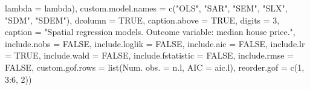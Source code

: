 \documentclass[
  letterpaper,
  DIV=11,
  numbers=noendperiod]{scrreprt}
\newenvironment{Shaded}{\begin{snugshade}}{\end{snugshade}}
\newcommand{\AttributeTok}[1]{\textcolor[rgb]{0.40,0.45,0.13}{#1}}
\newcommand{\ConstantTok}[1]{\textcolor[rgb]{0.56,0.35,0.01}{#1}}
\newcommand{\DecValTok}[1]{\textcolor[rgb]{0.68,0.00,0.00}{#1}}
\newcommand{\FunctionTok}[1]{\textcolor[rgb]{0.28,0.35,0.67}{#1}}
\newcommand{\NormalTok}[1]{\textcolor[rgb]{0.00,0.23,0.31}{#1}}
\newcommand{\OtherTok}[1]{\textcolor[rgb]{0.00,0.23,0.31}{#1}}
\newcommand{\SpecialCharTok}[1]{\textcolor[rgb]{0.37,0.37,0.37}{#1}}
\newcommand{\StringTok}[1]{\textcolor[rgb]{0.13,0.47,0.30}{#1}}
\begin{document}
\begin{Shaded}
\begin{Highlighting}[]
                                 \StringTok{\textquotesingle{}lambda\textquotesingle{}} \OtherTok{=} \StringTok{\textquotesingle{}lambda\textquotesingle{}}\NormalTok{),}
          \AttributeTok{custom.model.names =} \FunctionTok{c}\NormalTok{(}\StringTok{"OLS"}\NormalTok{, }\StringTok{"SAR"}\NormalTok{, }\StringTok{"SEM"}\NormalTok{, }\StringTok{"SLX"}\NormalTok{, }\StringTok{"SDM"}\NormalTok{, }\StringTok{"SDEM"}\NormalTok{),}
          \AttributeTok{dcolumn =} \ConstantTok{TRUE}\NormalTok{, }\AttributeTok{caption.above =} \ConstantTok{TRUE}\NormalTok{, }\AttributeTok{digits =} \DecValTok{3}\NormalTok{,}
          \AttributeTok{caption =} \StringTok{"Spatial regression models. Outcome variable: median house price."}\NormalTok{,}
          \AttributeTok{include.nobs =} \ConstantTok{FALSE}\NormalTok{,}
  \AttributeTok{include.loglik =} \ConstantTok{FALSE}\NormalTok{,}
  \AttributeTok{include.aic =} \ConstantTok{FALSE}\NormalTok{,}
  \AttributeTok{include.lr =} \ConstantTok{TRUE}\NormalTok{,}
  \AttributeTok{include.wald =} \ConstantTok{FALSE}\NormalTok{,}
  \AttributeTok{include.fstatistic =} \ConstantTok{FALSE}\NormalTok{,}
  \AttributeTok{include.rmse =} \ConstantTok{FALSE}\NormalTok{,}
  \AttributeTok{custom.gof.rows =} \FunctionTok{list}\NormalTok{(}\StringTok{\textquotesingle{}Num. obs.\textquotesingle{}} \OtherTok{=}\NormalTok{ n.l, }
                         \StringTok{\textquotesingle{}AIC\textquotesingle{}} \OtherTok{=}\NormalTok{ aic.l), }
  \AttributeTok{reorder.gof =} \FunctionTok{c}\NormalTok{(}\DecValTok{1}\NormalTok{, }\DecValTok{3}\SpecialCharTok{:}\DecValTok{6}\NormalTok{, }\DecValTok{2}\NormalTok{))}


\end{Highlighting}
\end{Shaded}
\end{document}
